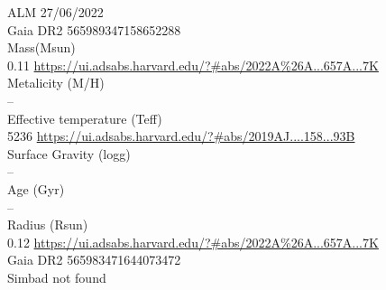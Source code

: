 ALM 27/06/2022\\
Gaia DR2 565989347158652288\\
Mass(Msun)\\
0.11 \url{https://ui.adsabs.harvard.edu/?#abs/2022A%26A...657A...7K}\\
Metalicity (M/H)\\
--\\
Effective temperature (Teff) \\
5236 \url{https://ui.adsabs.harvard.edu/?#abs/2019AJ....158...93B}\\
Surface Gravity (logg) \\
--\\
Age (Gyr)\\
--\\
Radius (Rsun)\\
0.12 \url{https://ui.adsabs.harvard.edu/?#abs/2022A%26A...657A...7K}\\
Gaia DR2 565983471644073472\\
Simbad not found\\
